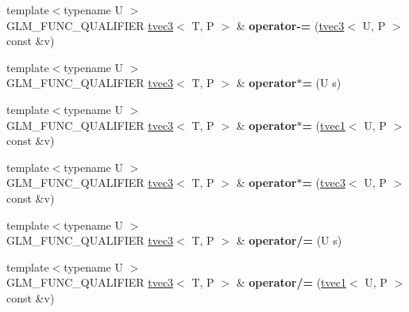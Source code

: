 \begin{DoxyCompactItemize}
\item 
\hypertarget{structglm_1_1tvec3_acec58495abe12a054d93d709f629f3c1}{{\footnotesize template$<$typename U $>$ }\\G\-L\-M\-\_\-\-F\-U\-N\-C\-\_\-\-Q\-U\-A\-L\-I\-F\-I\-E\-R \hyperlink{structglm_1_1tvec3}{tvec3}$<$ T, P $>$ \& {\bfseries operator-\/=} (\hyperlink{structglm_1_1tvec3}{tvec3}$<$ U, P $>$ const \&v)}\label{structglm_1_1tvec3_acec58495abe12a054d93d709f629f3c1}

\item 
\hypertarget{structglm_1_1tvec3_ac24c904eed1a53cdc94651e84a672ae6}{{\footnotesize template$<$typename U $>$ }\\G\-L\-M\-\_\-\-F\-U\-N\-C\-\_\-\-Q\-U\-A\-L\-I\-F\-I\-E\-R \hyperlink{structglm_1_1tvec3}{tvec3}$<$ T, P $>$ \& {\bfseries operator$\ast$=} (U s)}\label{structglm_1_1tvec3_ac24c904eed1a53cdc94651e84a672ae6}

\item 
\hypertarget{structglm_1_1tvec3_ad9d8d504912c0ffba2632830103e2b0c}{{\footnotesize template$<$typename U $>$ }\\G\-L\-M\-\_\-\-F\-U\-N\-C\-\_\-\-Q\-U\-A\-L\-I\-F\-I\-E\-R \hyperlink{structglm_1_1tvec3}{tvec3}$<$ T, P $>$ \& {\bfseries operator$\ast$=} (\hyperlink{structglm_1_1tvec1}{tvec1}$<$ U, P $>$ const \&v)}\label{structglm_1_1tvec3_ad9d8d504912c0ffba2632830103e2b0c}

\item 
\hypertarget{structglm_1_1tvec3_ac4c17428380a59febbd0c5f369f90b21}{{\footnotesize template$<$typename U $>$ }\\G\-L\-M\-\_\-\-F\-U\-N\-C\-\_\-\-Q\-U\-A\-L\-I\-F\-I\-E\-R \hyperlink{structglm_1_1tvec3}{tvec3}$<$ T, P $>$ \& {\bfseries operator$\ast$=} (\hyperlink{structglm_1_1tvec3}{tvec3}$<$ U, P $>$ const \&v)}\label{structglm_1_1tvec3_ac4c17428380a59febbd0c5f369f90b21}

\item 
\hypertarget{structglm_1_1tvec3_a37f9478c905eacfdc94c2d15edfa1ffe}{{\footnotesize template$<$typename U $>$ }\\G\-L\-M\-\_\-\-F\-U\-N\-C\-\_\-\-Q\-U\-A\-L\-I\-F\-I\-E\-R \hyperlink{structglm_1_1tvec3}{tvec3}$<$ T, P $>$ \& {\bfseries operator/=} (U s)}\label{structglm_1_1tvec3_a37f9478c905eacfdc94c2d15edfa1ffe}

\item 
\hypertarget{structglm_1_1tvec3_a8a8b6ba0700dfc397fe1bb232193de1d}{{\footnotesize template$<$typename U $>$ }\\G\-L\-M\-\_\-\-F\-U\-N\-C\-\_\-\-Q\-U\-A\-L\-I\-F\-I\-E\-R \hyperlink{structglm_1_1tvec3}{tvec3}$<$ T, P $>$ \& {\bfseries operator/=} (\hyperlink{structglm_1_1tvec1}{tvec1}$<$ U, P $>$ const \&v)}\label{structglm_1_1tvec3_a8a8b6ba0700dfc397fe1bb232193de1d}


\end{DoxyCompactItemize}
